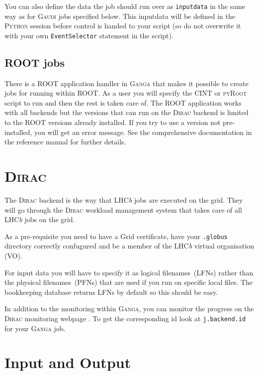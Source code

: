 \documentclass{howto}
\def\ganga {\textsc{Ganga}\xspace}
\def\python {\textsc{Python}\xspace}
\def\root {\textsc{ROOT}\xspace}
\def\lhcb {LHC{\em b\/}\xspace}
\def\gaudi {\textsc{Gaudi}\xspace}
\def\dirac {\textsc{Dirac}\xspace}
\begin{document}
You can also define the data the job should run over as \texttt{inputdata} in
the same way as for \gaudi jobs specified below. This inputdata will be
defined in the \python session before control is handed to your script (so do
not overwrite it with your own \texttt{EventSelector} statement in the
script).


\subsection{\root jobs}
\label{sec:ROOT}
There is a \root application handler in \ganga that makes it possible to
create jobs for running within \root. As a user you will specify the
\textsc{CINT} or \textsc{pyRoot} script to run and then the rest is taken care
of. The \root application works with all backends but the versions that can
run on the \dirac backend is limited to the \root versions already
installed. If you try to use a version not pre-installed, you will get an
error message. See the comprehensive documentation in the reference manual for
further details.

\section{\dirac}
\label{sec:dirac}
The \dirac backend is the way that \lhcb jobs are executed on the grid. They
will go through the \dirac workload management system that takes care of all
\lhcb jobs on the grid.
\begin{notice}
  As a pre-requisite you need to have a Grid certificate, have your
  \texttt{.globus} directory correctly confugured and be a member of the \lhcb
  virtual organisation (VO).
\end{notice}
For input data you will have to specify it as logical filenames~(LFNs) rather
than the physical filenames~(PFNs) that are used if you run on specific local
files. The bookkeeping database returns LFNs by default so this should be
easy.
\begin{seealso}
  In addition to the monitoring within \ganga, you can monitor the progress on
  the \dirac monitoring webpage
  . To get the
  corresponding id look at \texttt{j.backend.id} for your \ganga job.
\end{seealso}

\section{Input and Output}
\label{sec:InOut}
\end{document}
